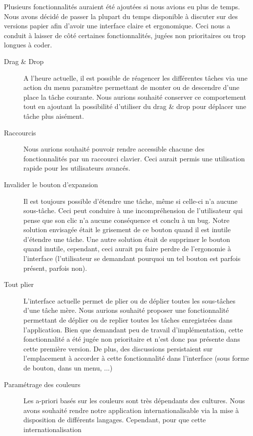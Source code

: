 \documentclass[11pt]{article}
\begin{document}
Plusieurs fonctionnalités auraient été ajoutées si nous avions eu plus
de temps. Nous avons décidé de passer la plupart du temps disponible à
discuter sur des versions papier afin d'avoir une interface claire et
ergonomique. Ceci nous a conduit à laisser de côté certaines
fonctionnalités, jugées non prioritaires ou trop longues à
coder.

\begin{description}
\item[Drag \& Drop] A l'heure actuelle, il est possible de réagencer
  les différentes tâches via une action du menu paramètre permettant
  de monter ou de descendre d'une place la tâche courante. Nous
  aurions souhaité conserver ce comportement tout en ajoutant la
  possibilité d'utiliser du drag \& drop pour déplacer une tâche plus
  aisément.
\item[Raccourcis] Nous aurions souhaité pouvoir rendre accessible
  chacune des fonctionnalités par un raccourci clavier. Ceci aurait
  permis une utilisation rapide pour les utilisateurs avancés.
\item[Invalider le bouton d'expansion] Il est toujours possible
  d'étendre une tâche, même si celle-ci n'a aucune sous-tâche. Ceci
  peut conduire à une incompréhension de l'utilisateur qui pense que
  son clic n'a aucune conséquence et conclu à un bug. Notre solution
  envisagée était le grisement de ce bouton quand il est inutile
  d'étendre une tâche. Une autre solution était de supprimer le bouton
  quand inutile, cependant, ceci aurait pu faire perdre de l'ergonomie
  à l'interface (l'utilisateur se demandant pourquoi un tel bouton est
  parfois présent, parfois non).
\item[Tout plier] L'interface actuelle permet de plier ou de déplier
  toutes les sous-tâches d'une tâche mère. Nous aurions souhaité
  proposer une fonctionnalité permettant de déplier ou de replier
  toutes les tâches enregistrées dans l'application. Bien que
  demandant peu de travail d'implémentation, cette fonctionnalité a
  été jugée non prioritaire et n'est donc pas présente dans cette
  première version. De plus, des discussions persistaient sur
  l'emplacement à accorder à cette fonctionnalité dans l'interface
  (sous forme de bouton, dans un menu, ...)
\item[Paramétrage des couleurs] Les a-priori basés sur les couleurs
  sont très dépendants des cultures. Nous avons souhaité rendre notre
  application internationalisable via la mise à disposition de
  différents langages. Cependant, pour que cette internationalisation

\end{description}
\end{document}
